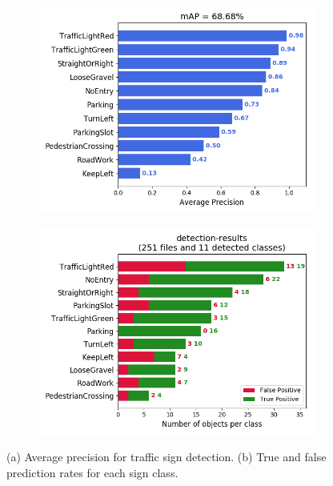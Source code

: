 \begin{figure}[h]
  \centering
  \begin{subfigure}[b]{0.45\linewidth}
    \includegraphics[width=\linewidth]{figures/experiments/mAP.png}
    \caption{}
  \end{subfigure}
  \begin{subfigure}[b]{0.45\linewidth}
    \includegraphics[width=\linewidth]{figures/experiments/detection-results-info.png}
    \caption{}
  \end{subfigure}
  \caption[Evaluation of traffic sign detection and recognition]{(a) Average
    precision for traffic sign detection. (b) True and false prediction rates
    for each sign class.}
  \label{figure:average-precision}
\end{figure}


